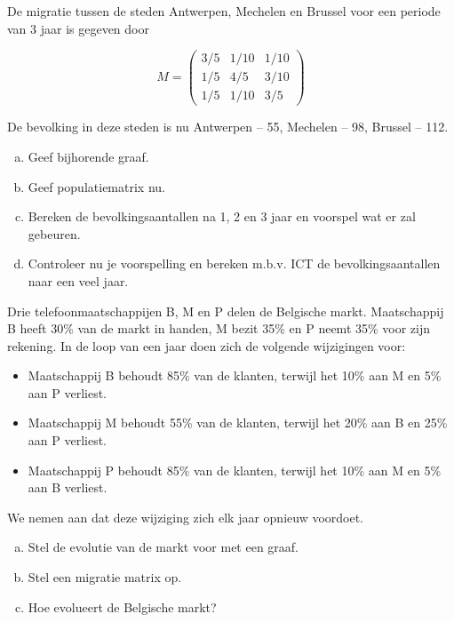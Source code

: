 \documentclass[12pt,twoside]{article}
\begin{document}
\begin{oefening}
De migratie tussen de steden Antwerpen, Mechelen en Brussel  voor een periode van 3 jaar
is gegeven door

$$
M = \begin{pmatrix}
  3/5 & 1/10 & 1/10\\
  1/5 & 4/5  & 3/10\\
  1/5 & 1/10 & 3/5
\end{pmatrix}
$$

De bevolking in deze steden is nu Antwerpen – 55, Mechelen – 98, Brussel – 112.

\begin{enumerate}[(a)]
  \item Geef bijhorende graaf.
  \item Geef populatiematrix nu.
  \item Bereken de bevolkingsaantallen na 1, 2 en 3 jaar en voorspel wat er zal gebeuren.
  \item Controleer nu je voorspelling en bereken m.b.v. ICT de bevolkingsaantallen naar een veel jaar.
\end{enumerate}
\end{oefening}

\begin{oefening}%
Drie telefoonmaatschappijen B, M en P delen de Belgische markt. Maatschappij B heeft 30\% van de markt in handen, M bezit 35\% en P neemt 35\% voor zijn rekening. In de loop van een jaar doen zich de volgende wijzigingen voor:
\begin{itemize}
  \item Maatschappij B behoudt 85\% van de klanten, terwijl het 10\% aan M en 5\% aan P verliest.
  \item Maatschappij M behoudt 55\% van de klanten, terwijl het 20\% aan B en 25\% aan P verliest.
  \item Maatschappij P behoudt 85\% van de klanten, terwijl het 10\% aan M en 5\% aan B verliest.
\end{itemize}
We nemen aan dat deze wijziging zich elk jaar opnieuw voordoet.

\begin{enumerate}[(a)]
  \item Stel de evolutie van de markt voor met een graaf.
  \item Stel een migratie matrix op.
  \item Hoe evolueert de Belgische markt?
\end{enumerate}
\end{oefening}
\end{document}
